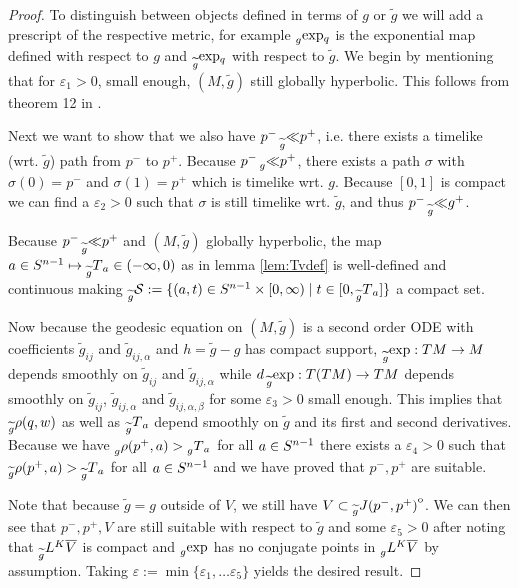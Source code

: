 \begin{proof}
    To distinguish between objects defined in terms of $g$ or $\widetilde{g}$ we will add a prescript of the respective metric, for example $\prescript{}{g}{\exp}_q$ is the exponential map defined with respect to $g$ and $\prescript{}{\widetilde{g}}{\exp}_q$ with respect to $\widetilde{g}$. We begin by mentioning that for $\varepsilon_1>0$, small enough, $(M,\widetilde{g})$ still globally hyperbolic. This follows from theorem 12 in \cite{gerochdomain}.
    
    Next we want to show that we also have $p^- \prescript{}{\widetilde{g}}{\ll} p^+$, i.e. there exists a timelike (wrt. $\widetilde{g}$) path from 
    $p^-$ to $p^+$. Because $p^- \prescript{}{g}{\ll} p^+$, there exists a path $\sigma$ with $\sigma(0)=p^-$ and $\sigma(1)=p^+$ which is timelike wrt. $g$. Because $[0,1]$ is compact we can find a $\varepsilon_2>0$ such that $\sigma$ is still timelike wrt. $\widetilde{g}$, and thus $p^-\prescript{}{\widetilde{g}}{\ll} g^+$.

    Because $p^-\prescript{}{\widetilde{g}}{\ll} p^+$ and $(M,\widetilde{g})$ globally hyperbolic, the map $a\in {S^{n-1}} \mapsto \prescript{}{\widetilde{g}}{T}_a\in (-\infty,0)$ as in lemma \ref{lem:Tvdef} is well-defined and continuous making $\prescript{}{\widetilde{g}}{{\mathcal{S}}} := \{(a,t)\in {S^{n-1}}\times [0,\infty) \mid t\in [0,\prescript{}{\widetilde{g}}{T}_a]\}$ a compact set. 

    Now because the geodesic equation on $(M,\widetilde{g})$ is a second order ODE with coefficients $\widetilde{g}_{ij}$ and $\widetilde{g}_{ij,\alpha}$ and $h=\widetilde{g}-g$ has compact support, $\prescript{}{\widetilde{g}}{\exp}:TM\to M$ depends smoothly on $\widetilde{g}_{ij}$ and $\widetilde{g}_{ij,\alpha}$ while $d\prescript{}{\widetilde{g}}{\exp}:T(TM)\to TM$ depends smoothly on $\widetilde{g}_{ij}$, $\widetilde{g}_{ij,\alpha}$ and $\widetilde{g}_{ij,\alpha,\beta}$ for some $\varepsilon_3>0$ small enough. This implies that $\prescript{}{\widetilde{g}}{\rho(q,w)}$ as well as $\prescript{}{\widetilde{g}}{T}_a$ depend smoothly on $\widetilde{g}$ and its first and second derivatives. Because we have $\prescript{}{g}{\rho(p^+,a)}>\prescript{}{g}{T}_a$ for all $a\in {S^{n-1}}$ there exists a $\varepsilon_4>0$ such that $\prescript{}{\widetilde{g}}{\rho(p^+,a)}>\prescript{}{\widetilde{g}}{T}_a$ for all $a\in {S^{n-1}}$ and we have proved that $p^-,p^+$ are suitable.

    Note that because $\widetilde{g}=g$ outside of $V$, we still have $V\subset {\kern0pt\prescript{}{\widetilde{g}}{J(p^-,p^+)}}^{\mathrm{o}}$. We can then see that $p^-,p^+,V$ are still suitable with respect to $\widetilde{g}$ and some $\varepsilon_5>0$ after noting that $\prescript{}{\widetilde{g}}{L}^K{\overline{V}}$ is compact and $\prescript{}{g}{\exp}$ has no conjugate points in $\prescript{}{g}{L}^K{\overline{V}}$ by assumption. Taking $\varepsilon:=\min \{\varepsilon_1,\dots \varepsilon_5\}$ yields the desired result.
\end{proof}

